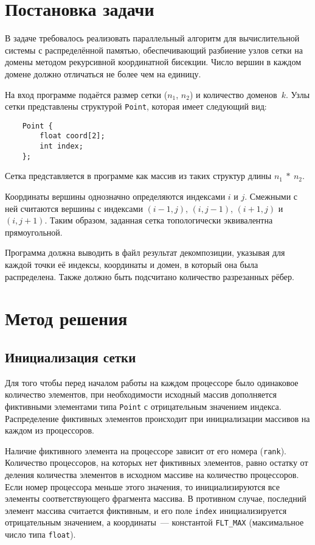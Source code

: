 \documentclass[oneside,final,14pt]{extreport}
\begin{document}
{\let\clearpage\relax \chapter*{Постановка задачи}}

В задаче требовалось реализовать параллельный алгоритм для вычислительной
системы с распределённой памятью, обеспечивающий разбиение узлов сетки
на домены методом рекурсивной координатной бисекции. Число вершин в каждом
домене должно отличаться не более чем на единицу.

На вход программе подаётся размер сетки ($n_1$, $n_2$) и количество доменов~$k$. Узлы сетки
представлены структурой \texttt{Point}, которая имеет следующий вид:
\begin{verbatim}
    Point {
        float coord[2];
        int index;
    };
\end{verbatim}
Сетка представляется в программе как массив из таких структур длины $n_1~*~n_2$.

Координаты вершины однозначно определяются индексами $i$ и $j$. Смежными с
ней считаются вершины с индексами $(i - 1, j)$, $(i, j - 1)$, $(i + 1, j)$
и $(i, j + 1)$. Таким образом, заданная сетка топологически эквивалентна
прямоугольной.

Программа должна выводить в файл результат декомпозиции, указывая для
каждой точки её индексы, координаты и домен, в который она была распределена.
Также должно быть подсчитано количество разрезанных рёбер.

\chapter*{Метод решения}

\section*{Инициализация сетки}

Для того чтобы перед началом работы на каждом процессоре было одинаковое количество
элементов, при необходимости
исходный массив дополняется фиктивными элементами типа \texttt{Point} с
отрицательным значением индекса. Распределение фиктивных элементов происходит
при инициализации массивов на каждом из процессоров.

Наличие фиктивного элемента на процессоре зависит от его номера (\texttt{rank}).
Количество процессоров, на которых нет фиктивных элементов, равно остатку от
деления количества элементов в исходном массиве на количество процессоров.
Если номер процессора меньше этого значения, то инициализируются все элементы
соответствующего фрагмента массива. В противном случае, последний элемент
массива считается фиктивным, и его поле \texttt{index} инициализируется
отрицательным значением, а координаты~--- константой \texttt{FLT\_MAX}
(максимальное число типа \texttt{float}).
\end{document}
